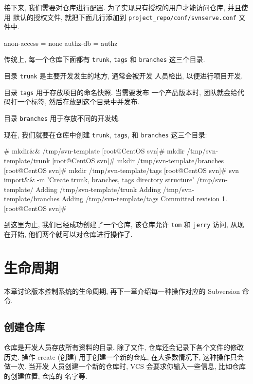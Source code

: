 \documentclass[nofonts, oneside]{ctexbook}
\newcommand\svn{\texttt{svn}}
\newcommand\svnim{\texttt{import}}
\begin{document}
接下来, 我们需要对仓库进行配置. 为了实现只有授权的用户才能访问仓库, 并且使用
默认的授权文件, 就把下面几行添加到
\texttt{project\_repo/conf/svnserve.conf}
文件中.
\begin{svnshell}
anon-access = none
authz-db = authz
\end{svnshell}

传统上, 每一个仓库下面都有 \texttt{trunk}, \texttt{tags} 和 \texttt{branches}
这三个目录.

目录 \texttt{trunk} 是主要开发发生的地方, 通常会被开发
人员检出, 以便进行项目开发.

目录 \texttt{tags} 用于存放项目的命名快照. 当需要发布
一个产品版本时, 团队就会给代码打一个标签, 然后存放到这个目录中并发布.

目录 \texttt{branches} 用于存放不同的开发线.

现在, 我们就要在仓库中创建 \texttt{trunk}, \texttt{tags}, 和 \texttt{branches}
这三个目录:
\begin{svnshell}
# mkdir&& /tmp/svn-template
[root@CentOS svn]# mkdir /tmp/svn-template/trunk
[root@CentOS svn]# mkdir /tmp/svn-template/branches
[root@CentOS svn]# mkdir /tmp/svn-template/tags
[root@CentOS svn]# svn import&\index{svn@\svn!\svnim}& -m 'Create trunk, branches, tags directory structure' /tmp/svn-template/
Adding              /tmp/svn-template/trunk
Adding              /tmp/svn-template/branches
Adding              /tmp/svn-template/tags
Committed revision 1.
[root@CentOS svn]#
\end{svnshell}

到这里为止, 我们已经成功创建了一个仓库, 该仓库允许 \texttt{tom} 和
\texttt{jerry} 访问, 从现在开始, 他们两个就可以对仓库进行操作了.

\chapter{生命周期}
\label{chap:life_cycle}

本章讨论版本控制系统的生命周期, 再下一章介绍每一种操作对应的 Subversion 命令.

\section{创建仓库}
\label{sec:create_repository}

仓库是开发人员存放所有资料的目录. 除了文件, 仓库还会记录下各个文件的修改历史.
操作 create (创建) 用于创建一个新的仓库, 在大多数情况下, 这种操作只会做一次. 当开发
人员创建一个新的仓库时, VCS 会要求你输入一些信息, 比如仓库的创建位置, 仓库的
名字等.
\end{document}
